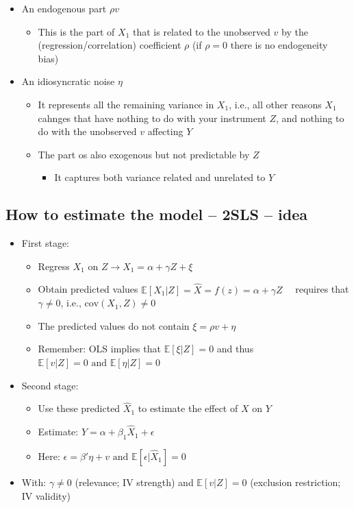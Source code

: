 \documentclass[10pt]{article}
\begin{document}
\begin{itemize}
\begin{itemize}
        \item An endogenous part $\rho v $
        \begin{itemize}
            \item This is the part of $X_1 $ that is related to the unobserved $v $ by the (regression/correlation) coefficient $\rho $ (if $\rho = 0 $ there is no endogeneity bias)
        \end{itemize}
        \item An idiosyncratic noise $\eta $
        \begin{itemize}
            \item It represents all the remaining variance in $X_1 $, i.e., all other reasons $X_1 $ cahnges that have nothing to do with your instrument $Z $, and nothing to do with the unobserved $v $ affecting $Y $
            \item The part os also exogenous but not predictable by $Z $
            \begin{itemize}
                \item It captures both variance related and unrelated to $Y $
            \end{itemize}
        \end{itemize}
    \end{itemize}
\end{itemize}
\newpage 
\subsection{How to estimate the model -- 2SLS -- idea}
\begin{itemize}
    \item First stage: 
    \begin{itemize}
        \item Regress $X_1 \text{ on } Z \to X_1 = \alpha + \gamma Z + \xi $ 
        \item Obtain predicted values $\mathbb{E}[X_1|Z] = \hat{X} = f(z) = \alpha + \gamma Z \quad $ requires that $\gamma \neq 0 $, i.e., $\text{cov}(X_1, Z) \neq 0 $
        \item The predicted values do not contain $\xi = \rho v + \eta $
        \item Remember: OLS implies that $\mathbb{E}[\xi|Z] = 0 $ and thus $\mathbb{E}[v|Z] = 0 \text{ and } \mathbb{E}[\eta|Z] = 0 $
    \end{itemize}
    \item Second stage: 
    \begin{itemize}
        \item Use these predicted $\hat{X}_1 $ to estimate the effect of $X \text{ on } Y $
        \item Estimate: $Y = \alpha + \beta_1\hat{X}_1 + \epsilon $
        \item Here: $\epsilon = \beta'\eta + v \text{ and } \mathbb{E}\left[\epsilon|\hat{X}_1\right] = 0 $
    \end{itemize}
    \item With: $\gamma \neq 0 $ (relevance; IV strength) and $\mathbb{E}[v|Z] = 0 $ (exclusion restriction; IV validity)
\end{itemize}
\end{document}
